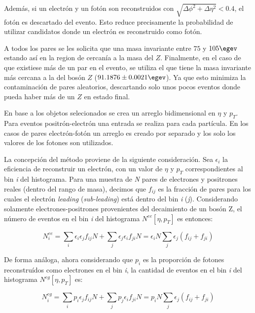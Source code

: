 Además, si un electrón y un fotón son reconstruidos con $\sqrt{\Delta\phi^{2}+\Delta\eta^{2}}<0.4$, el fotón es descartado del evento. Esto reduce precisamente la probabilidad de utilizar candidatos donde un electrón es reconstruido como fotón. 

A todos los pares se les solicita que una masa invariante entre $75$ y $105 \egev$  estando así en la region de cercanía a la masa del $Z$. Finalmente, en el caso de que existiese más de un par en el evento, se utiliza el que tiene la masa invariante más cercana a la del bosón $Z$ ($91.1876 \pm 0.0021 \egev$\cite{Olive:2016xmw}). Ya que esto minimiza la contaminación de pares aleatorios, descartando solo unos pocos eventos donde pueda haber más de un $Z$ en estado final.


En base a los objetos selecionados se crea un arreglo bidimensional en  $\eta$ y $p_{T}$. Para eventos positrón-electrón una entrada se realiza para cada partícula. En los casos de pares electrón-fotón un arreglo es creado por separado y los solo los valores de los fotones son utilizados.

La concepción del método proviene de la siguiente consideración. Sea $\epsilon_{i}$ la eficiencia de reconstruir un electrón, con un valor de $\eta$ y $p_{T}$ correspondientes al bin \textit{i} del histograma. Para una muestra de \textit{N} pares de electrones y positrones reales (dentro del rango de masa), decimos que $f_{ij}$ es la fracción de pares para los cuales el electrón \textit{leading} (\textit{sub-leading}) está dentro del bin \textit{i} (\textit{j}). Considerando solamente electrones-positrones provenientes del decaimiento de un bosón Z, el número de eventos en el bin \textit{i} del histograma $N^{ee}[\eta , p_{T}]$ es entonces:

\begin{equation}
N_{i}^{ee} = \sum_{i}\epsilon_{i}\epsilon_{j}f_{ij}N + \sum_{j}\epsilon_{j}\epsilon_{i}f_{ji}N = \epsilon_{i}N\sum_{j}\epsilon_{j}(f_{ij}+f_{ji})
\end{equation}

De forma análoga, ahora considerando que $p_{i}$ es la proporción de fotones reconstruídos como electrones en el bin \textit{i}, la cantidad de eventos en el bin \textit{i} del histograma $N^{eg}[\eta , p_{T}]$ es:

\begin{equation}
N_{i}^{eg} = \sum_{i}p_{i}\epsilon_{j}f_{ij}N + \sum_{j}p_{j}\epsilon_{i}f_{ji}N = p_{i}N\sum_{j}\epsilon_{j}(f_{ij}+f_{ji})
\end{equation}


